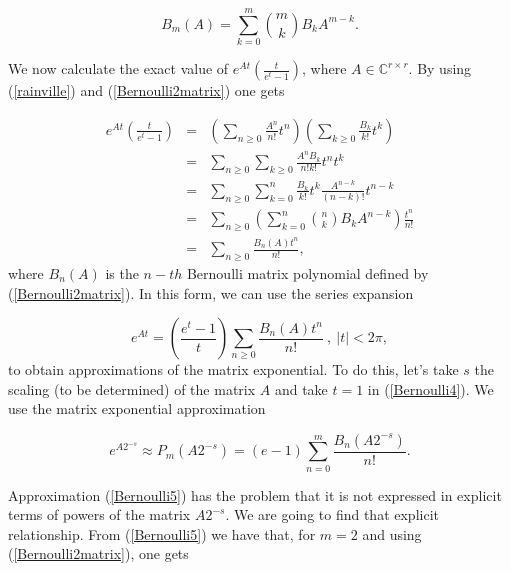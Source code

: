 \documentclass[preprint,10pt]{elsarticle}
\begin{document}
\begin{equation}\label{Bernoulli2matrix}
B_m(A)=\sum_{k=0}^{m} {m \choose k} B_k A^{m-k}.
\end{equation}

We now calculate the exact value of $\displaystyle e^{At}\left(\frac{t}{e^t-1}\right)$, where $A \in \mathbb{C}^{r \times r}$.
By using (\ref{rainville}) and (\ref{Bernoulli2matrix}) one gets


\begin{eqnarray*}
e^{At}\left( \frac{t}{e^t-1} \right) &=& \left(\sum_{n \geq 0} \frac{A^n}{n!}t^n \right) \left(\sum_{k \geq 0} \frac{B_k}{k!}t^k \right) \\
&=& \sum_{n \geq 0} \sum_{k \geq 0} \frac{A^n B_k}{n! k!}t^n t^k  \\
&=& \sum_{n \geq 0}\sum_{k=0}^{n} \frac{B_k}{k!}t^k \frac{A^{n-k}}{(n-k)!}t^{n-k} \\
&=& \sum_{n \geq 0}\left(\sum_{k=0}^{n}{n \choose k} B_k A^{n-k}
\right) \frac{t^{n}}{n!}\\
&=& \sum_{n \geq 0} \frac{ B_n(A) t^{n}}{n!},
\end{eqnarray*}
where $B_n(A)$ is the $n-th$ Bernoulli matrix polynomial defined by (\ref{Bernoulli2matrix}). In this form, we can use the series expansion

\begin{equation}\label{Bernoulli4}
e^{At} = \left(\frac{e^t-1}{t}\right)\sum_{n \geq 0} \frac{ B_n(A) t^{n}}{n!} \ , \ |t|<2\pi,
\end{equation}
to obtain approximations of the matrix exponential. To do this, let's take $s$ the scaling (to be determined) of the matrix $A$ and take $t=1$ in (\ref{Bernoulli4}). We use the matrix exponential  approximation

\begin{equation}\label{Bernoulli5}
e^{A 2^{-s}}\approx  P_{m}(A2^{-s})=\left(e-1 \right)\sum_{n=0}^m \frac{B_n\left(A 2^{-s}\right)}{n!}.
\end{equation}


Approximation (\ref{Bernoulli5}) has the problem that it is not expressed in explicit terms of powers of the matrix $A2^{-s}$. We are going to find that explicit relationship. From
(\ref{Bernoulli5}) we have that, for $m=2$ and using (\ref{Bernoulli2matrix}), one gets
\end{document}
